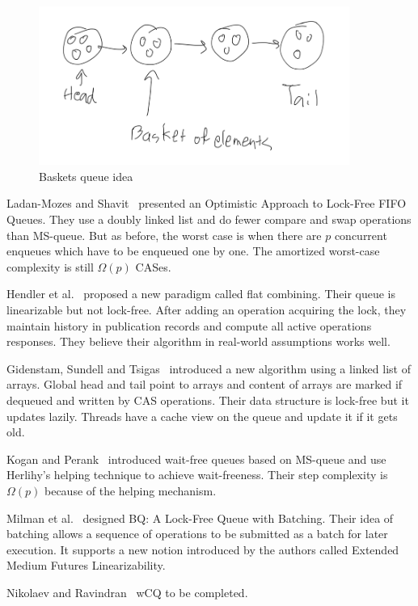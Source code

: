 \documentclass[12pt]{article}
\begin{document}
\begin{figure}[hbt]
  \center\includegraphics[width=4in]{pics/baskets}
  \caption{Baskets queue idea}
\end{figure}

Ladan-Mozes and Shavit~\cite{DBLP:journals/dc/Ladan-MozesS08} presented an Optimistic Approach to Lock-Free FIFO Queues. They use a doubly linked list and do fewer compare and swap operations than MS-queue. But as before, the worst case is when there are $p$ concurrent enqueues which have to be enqueued one by one. The amortized worst-case complexity is still $\Omega(p)$ CASes.

Hendler et al.~\cite{DBLP:conf/spaa/HendlerIST10} proposed a new paradigm called flat combining. Their queue is linearizable but not lock-free. After adding an operation acquiring the lock, they maintain history in publication records and compute all active operations responses. They believe their algorithm in real-world assumptions works well.

Gidenstam, Sundell and Tsigas~\cite{DBLP:conf/opodis/GidenstamST10} introduced a new algorithm using a linked list of arrays. Global head and tail point to arrays and content of arrays are marked if dequeued and written by CAS operations. Their data structure is lock-free but it updates lazily. Threads have a cache view on the queue and update it if it gets old.

Kogan and Perank~\cite{DBLP:conf/ppopp/KoganP11} introduced wait-free queues based on MS-queue and use Herlihy's helping technique to achieve wait-freeness. Their step complexity is $\Omega(p)$ because of the helping mechanism.

Milman et al.~\cite{DBLP:conf/spaa/MilmanKLLP18} designed BQ: A Lock-Free Queue with Batching. Their idea of batching allows a sequence of operations to be submitted as a batch for later execution. It supports a new notion introduced by the authors called Extended Medium Futures Linearizability.

Nikolaev and Ravindran~\cite{DBLP:journals/corr/abs-2201-02179} wCQ to be completed.
\end{document}
